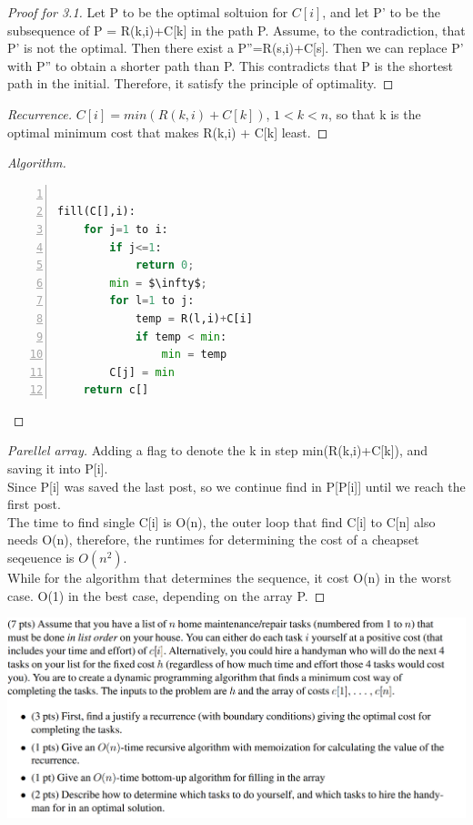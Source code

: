 \documentclass[12pt]{article}
\begin{document}
\begin{proof}[Proof for 3.1]
	Let P to be the optimal soltuion for $C[i]$, and let P' to be the subsequence of P = R(k,i)+C[k] in the path P. Assume, to the contradiction, that P' is not the optimal. Then there exist a P''=R(s,i)+C[s]. Then we can replace P' with P'' to obtain a shorter path than P. This contradicts that P is the shortest path in the initial. Therefore, it satisfy the principle of optimality.
\end{proof}
\begin{proof}[Recurrence]
	$C[i] = min(R(k,i)+C[k])$, $1<k<n$, so that k is the optimal minimum cost that makes R(k,i) + C[k] least.
\end{proof}
\begin{proof}[Algorithm]
	\begin{lstlisting}[language={python},numbers=left,numberstyle=\tiny,%frame=shadowbox,  
		rulesepcolor=\color{red!20!green!20!blue!20},  
		keywordstyle=\color{blue!70!black},  
		commentstyle=\color{blue!90!},  
		basicstyle=\ttfamily]  
		
fill(C[],i):
	for j=1 to i:
		if j<=1:
			return 0;
		min = $\infty$;
		for l=1 to j:
			temp = R(l,i)+C[i]
			if temp < min:
				min = temp
		C[j] = min
	return c[]
	\end{lstlisting}
\end{proof}
\begin{proof}[Parellel array]
	Adding a flag to denote the k in step min(R(k,i)+C[k]), and saving it into P[i].\\
	Since P[i] was saved the last post, so we continue find in P[P[i]] until we reach the first post.\\
	The time to find single C[i] is O(n), the outer loop that find C[i] to C[n] also needs O(n), therefore, the runtimes for determining the cost of a cheapset seqeuence is $O(n^2)$.\\
	While for the algorithm that determines the sequence, it cost O(n) in the worst case. O(1) in the best case, depending on the array P.
\end{proof}
\bigskip
\includegraphics[scale=0.24]{4.png}
\end{document}
